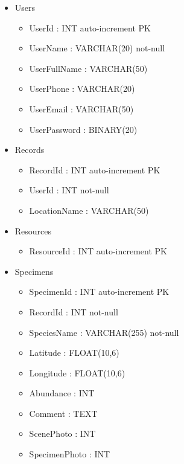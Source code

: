         \begin{itemize}
            \item Users
            \begin{itemize}
                \item UserId : INT auto-increment PK
                \item UserName : VARCHAR(20) not-null
                \item UserFullName : VARCHAR(50)
                \item UserPhone : VARCHAR(20)
                \item UserEmail : VARCHAR(50)
                \item UserPassword : BINARY(20)
            \end{itemize}
                
            \item Records
            \begin{itemize}
                \item RecordId : INT auto-increment PK
                \item UserId : INT not-null
                \item LocationName : VARCHAR(50)
            \end{itemize}
                
            \item Resources
            \begin{itemize}
                \item ResourceId : INT auto-increment PK
            \end{itemize}

            \item Specimens
            \begin{itemize}
                \item SpecimenId : INT auto-increment PK
                \item RecordId : INT not-null
                \item SpeciesName : VARCHAR(255) not-null
                \item Latitude : FLOAT(10,6)
                \item Longitude : FLOAT(10,6)
                \item Abundance : INT
                \item Comment : TEXT
                \item ScenePhoto : INT
                \item SpecimenPhoto : INT   
            \end{itemize}
        \end{itemize}